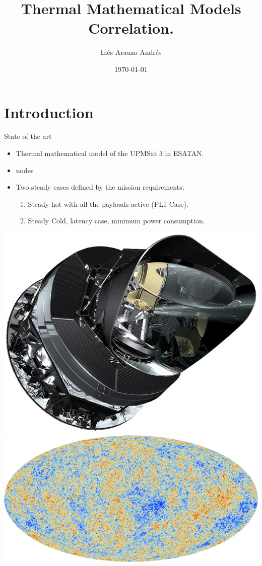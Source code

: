\documentclass{cubeamer}
\title{Thermal Mathematical Models Correlation.}
\author[Inés Arauzo Andres]{Inés Arauzo Andrés}
\date{\today} %
\institute[UPM]{ \\

\footnotesize{MUSE  IDR-UPM-ETSIAE}}
\begin{document}
\maketitle

\cutoc

\section{Introduction}

\begin{frame}{State of the art}
    \begin{minipage}{0.65\textwidth}
    \begin{itemize}
        \item Thermal mathematical model of the UPMSat 3 in ESATAN. 
        \item {} nodes
        \item Two steady cases defined by the mission requirements:
        \begin{enumerate}
            \item Steady hot with all the payloads active (PL1 Case).
            \item Steady Cold, latency case, minimum power consumption.
        \end{enumerate}
    \end{itemize}
    \end{minipage}
    \begin{minipage}{0.3\textwidth}
    \includegraphics[width=0.9\linewidth]{Figures/Planck1.jpg} \\
    \includegraphics[width=0.9\linewidth]{Figures/Planck2.jpg}
    \end{minipage}
    
\end{frame}
\end{document}
